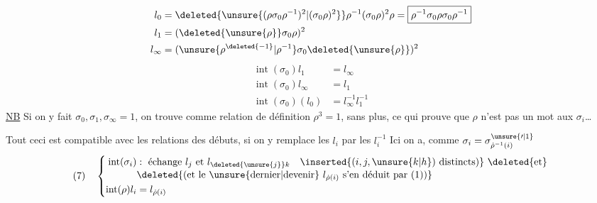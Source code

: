 {\[
\begin{aligned}
l_0&=\deleted{\unsure{(\rho\sigma_0\rho^{-1})^2|(\sigma_0\rho)^2}}\rho^{-1}(\sigma_0\rho)^2\rho
=\boxed{\rho^{-1}\sigma_0\rho\sigma_0\rho^{-1}}\\
l_1&=(\deleted{\unsure{\rho}}\sigma_0\rho)^2\\
l_\infty&=(\unsure{\rho^{\deleted{-1}}|\rho^{-1}}\sigma_0\deleted{\unsure{\rho}})^2
\end{aligned}
\]
\[
\begin{aligned}
\operatorname{int}(\sigma_0)l_1&=l_\infty\\
\operatorname{int}(\sigma_0)l_\infty&=l_1\\
\operatorname{int}(\sigma_0)(l_0)&=l_\infty^{-1}l_1^{-1}
\end{aligned}
\]}
\uline{NB} Si on y fait  $\sigma_0,\sigma_1,\sigma_\infty=1$, on trouve comme relation de définition $\rho^3=1$,  sans plus, ce qui prouve que $\rho$ n'est pas un mot  aux $\sigma_i$\ldots

Tout ceci est compatible avec les relations des débuts, 
  si on y remplace les $l_i$ par les $l_i^{-1}$
Ici on a, comme $\sigma_i=\sigma^{\unsure{\prime|1}}_{\dot\rho^{-1}(i)}$
\[
(7)\quad\left\{\begin{aligned}
\operatorname{int}(\sigma_i)&:\text{ échange }l_j\text{ et }l_{\deleted{\unsure{j}}k}
\quad\inserted{(i,j,\unsure{k|h})\text{ distincts})}\ \deleted{\text{et}}\\[-2pt]
&\deleted{\text{(et le }\unsure{\text{dernier}|\text{devenir}}\ l_{\dot\rho(i)}\ \text{s'en déduit par (1))}}\\
\operatorname{int}(\rho)l_i&=l_{\dot\rho(i)}
\end{aligned}\right.
\]

